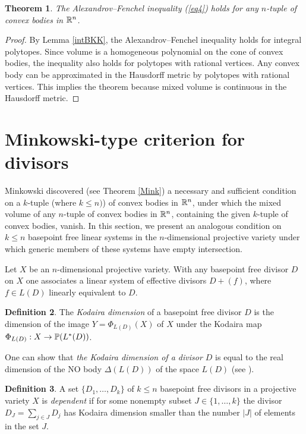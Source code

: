 \documentclass[11pt]{article}
\theoremstyle{plain}
\newtheorem{theorem}{Theorem}[section]
\theoremstyle{definition}
\newtheorem{definition}[theorem]{Definition}
\begin{document}
\begin{theorem} The Alexandrov--Fenchel inequality (\ref{eq4}) holds for any $n$-tuple of convex bodies in $\Bbb R^n$.
\end{theorem}

\begin{proof} By Lemma \ref{intBKK}, the  Alexandrov--Fenchel inequality holds for integral polytopes. Since volume is a homogeneous polynomial on the cone of convex bodies, the inequality also  holds for polytopes with rational vertices. Any convex body can be approximated in the Hausdorff metric by polytopes with rational vertices.
This implies the theorem because mixed volume is continuous in the Hausdorff metric.
\end{proof}


\section{Minkowski-type criterion for divisors}\label{sect9}

Minkowski discovered (see Theorem \ref{Mink})  a  necessary and sufficient condition on a $k$-tuple (where  $k\leq n)$)  of  convex bodies in $\Bbb R^n$, under  which the mixed volume of any $n$-tuple of convex bodies in $\Bbb R^n$, containing  the given $k$-tuple of convex bodies, vanish. In this section, we present an analogous condition  on $k\leq n$ basepoint free linear systems in the $n$-dimensional projective variety under which generic members of these systems have empty intersection.

Let $X$ be an $n$-dimensional projective variety.
With any basepoint free divisor $D$ on $X$ one associates a linear system of effective divisors $D+(f)$, where $f\in L(D)$ linearly equivalent to $D$.

\begin{definition} The {\it  Kodaira dimension} of a basepoint free divisor $D$ is the dimension of the image $Y=\Phi_{L(D)}(X)$ of $X$ under the Kodaira map $\Phi_{L(D)}:X\to \Bbb P (L^*(D))$.
\end{definition}

One can show that {\it the Kodaira dimension of a divisor  $D$} is equal to the real dimension of the NO body $\Delta(L(D))$ of the space $L(D)$ (see  \cite{K-K12}).


\begin{definition} A set $\{D_1,\dots,D_k\}$ of $k\leq n $
basepoint free  divisors in a projective variety $X$ is {\it  dependent} if   for some nonempty subset $J\in \{1,\dots,k\}$  the divisor  $D_J=\sum_{j\in J} D_j$ has Kodaira dimension smaller  than the number $|J|$ of elements in the set $J$.
\end{definition}
\end{document}

